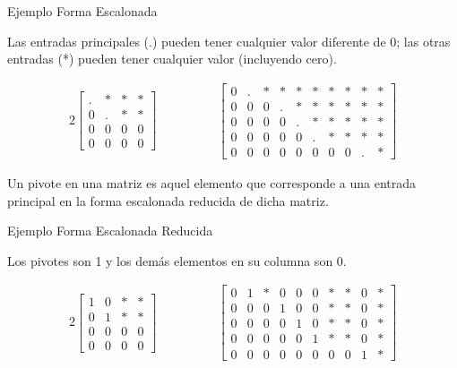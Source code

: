 \documentclass{article}
\begin{document}
\begin{large}
    Ejemplo Forma Escalonada
\end{large}

Las entradas principales (.) pueden tener cualquier valor diferente de 0; las otras entradas (*) pueden tener cualquier valor (incluyendo cero).

\begin{alignat*}{2}
    \begin{bmatrix}
        .&*&*&*\\
        0&.&*&*\\
        0&0&0&0\\
        0&0&0&0
    \end{bmatrix}
    & \hspace{ 4em}%
    \begin{bmatrix}
        0&.&*&*&*&*&*&*&*&*\\
        0&0&0&.&*&*&*&*&*&*\\
        0&0&0&0&.&*&*&*&*&*\\
        0&0&0&0&0&.&*&*&*&*\\
        0&0&0&0&0&0&0&0&.&*
    \end{bmatrix}
\end{alignat*}

\begin{tcolorbox}[colback=green!20!white,colframe=green!80!black,title=Pivote]
    Un pivote en una matriz es aquel elemento que corresponde a una entrada principal en la forma escalonada reducida de dicha matriz.
\end{tcolorbox}

\begin{large}
    Ejemplo Forma Escalonada Reducida
\end{large}

Los pivotes son 1 y los demás elementos en su columna son 0.

\begin{alignat*}{2}
    \begin{bmatrix}
        1&0&*&*\\
        0&1&*&*\\
        0&0&0&0\\
        0&0&0&0
    \end{bmatrix}
    & \hspace{ 4em}%
    \begin{bmatrix}
        0&1&*&0&0&0&*&*&0&*\\
        0&0&0&1&0&0&*&*&0&*\\
        0&0&0&0&1&0&*&*&0&*\\
        0&0&0&0&0&1&*&*&0&*\\
        0&0&0&0&0&0&0&0&1&*
    \end{bmatrix}
\end{alignat*}
\end{document}
